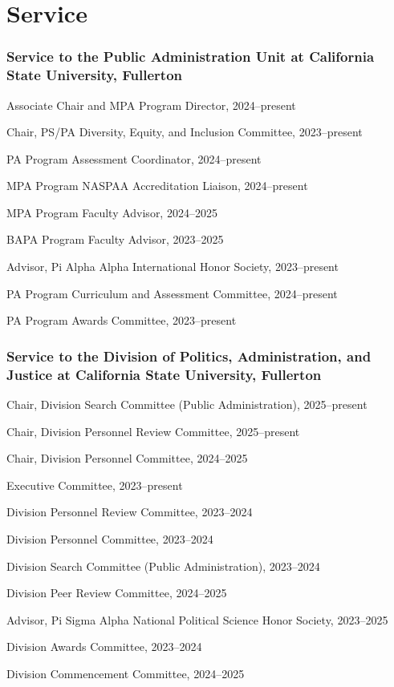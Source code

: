 \documentclass[12pt,letterpaper]{article}
\renewenvironment{itemize}{
  \begin{list}{}{
    \setlength{\leftmargin}{1.5em}
    \setlength{\itemsep}{0.25em}
    \setlength{\parskip}{0pt}
    \setlength{\parsep}{0.25em}
  }
}{
  \end{list}
}
\begin{document}
\section*{Service}

\subsubsection*{Service to the Public Administration Unit at California State University, Fullerton}
\begin{itemize}\leftmargin=2pt\itemindent=-15pt
  \item Associate Chair and MPA Program Director, 2024--present
  \item Chair, PS/PA Diversity, Equity, and Inclusion Committee, 2023--present
  \item PA Program Assessment Coordinator, 2024--present
  \item MPA Program NASPAA Accreditation Liaison, 2024--present
  \item MPA Program Faculty Advisor, 2024--2025
  \item BAPA Program Faculty Advisor, 2023--2025
  \item Advisor, Pi Alpha Alpha International Honor Society, 2023--present
  \item PA Program Curriculum and Assessment Committee, 2024--present
  \item PA Program Awards Committee, 2023--present
\end{itemize}

\subsubsection*{Service to the Division of Politics, Administration, and Justice at California State University, Fullerton}
\begin{itemize}\leftmargin=2pt\itemindent=-15pt
  \item Chair, Division Search Committee (Public Administration), 2025--present
  \item Chair, Division Personnel Review Committee, 2025--present
  \item Chair, Division Personnel Committee, 2024--2025
  \item Executive Committee, 2023--present
  \item Division Personnel Review Committee, 2023--2024
  \item Division Personnel Committee, 2023--2024
  \item Division Search Committee (Public Administration), 2023--2024
  \item Division Peer Review Committee, 2024--2025
  \item Advisor, Pi Sigma Alpha National Political Science Honor Society, 2023--2025
  \item Division Awards Committee, 2023--2024
  \item Division Commencement Committee, 2024--2025
\end{itemize}
\end{document}
